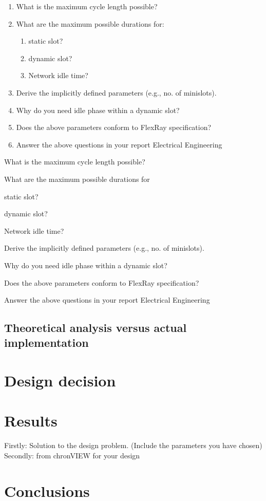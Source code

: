 \begin{enumerate}
	\item What is the maximum cycle length possible? 
	
	\item What are the maximum possible durations for:
	
	\begin{enumerate}
			\item static slot?
			
			\item dynamic slot?
			
			\item Network idle time?
	\end{enumerate}	
	
	\item Derive the implicitly defined parameters (e.g., no. of minislots).
	
	\item Why do you need idle phase within a dynamic slot?
	
	\item Does the above parameters conform to FlexRay specification?
	
	\item Answer the above questions in your report Electrical Engineering
\end{enumerate}
What is the maximum cycle length possible? 

What are the maximum possible durations for

static slot?

dynamic slot?

Network idle time?

Derive the implicitly defined parameters (e.g., no. of minislots).

Why do you need idle phase within a dynamic slot?

Does the above parameters conform to FlexRay specification?

Answer the above questions in your report Electrical Engineering



\subsection{Theoretical analysis versus actual implementation}


\section{Design decision}

\section{Results}

Firstly: Solution to the design problem. (Include the parameters you have chosen)\\
Secondly: from chronVIEW for your design

\section{Conclusions}
